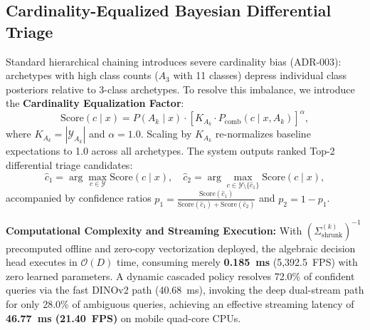 \subsection{Cardinality-Equalized Bayesian Differential Triage}
\label{subsec:bayesian_differential_triage}
Standard hierarchical chaining introduces severe cardinality bias (ADR-003): archetypes with high class counts ($A_3$ with 11 classes) depress individual class posteriors relative to 3-class archetypes. To resolve this imbalance, we introduce the \textbf{Cardinality Equalization Factor}:
\begin{equation}
    \text{Score}(c \mid x) = P(A_k \mid x) \cdot \left[ K_{A_k} \cdot P_{\text{comb}}(c \mid x, A_k) \right]^\alpha,
    \label{eq:cardinality_score}
\end{equation}
where $K_{A_k} = |\mathcal{Y}_{A_k}|$ and $\alpha = 1.0$. Scaling by $K_{A_k}$ re-normalizes baseline expectations to 1.0 across all archetypes. The system outputs ranked Top-2 differential triage candidates:
\begin{equation}
    \hat{c}_1 = \arg\max_{c \in \mathcal{Y}} \text{Score}(c \mid x), \quad \hat{c}_2 = \arg\max_{c \in \mathcal{Y} \setminus \{\hat{c}_1\}} \text{Score}(c \mid x),
    \label{eq:top1_top2_decision}
\end{equation}
accompanied by confidence ratios $p_1 = \frac{\text{Score}(\hat{c}_1)}{\text{Score}(\hat{c}_1) + \text{Score}(\hat{c}_2)}$ and $p_2 = 1 - p_1$.

\noindent\textbf{Computational Complexity and Streaming Execution:}
With $\left(\Sigma_{\text{shrunk}}^{(k)}\right)^{-1}$ precomputed offline and zero-copy vectorization deployed, the algebraic decision head executes in $\mathcal{O}(D)$ time, consuming merely \textbf{0.185~ms} (5,392.5~FPS) with zero learned parameters. A dynamic cascaded policy resolves 72.0\% of confident queries via the fast DINOv2 path (40.68~ms), invoking the deep dual-stream path for only 28.0\% of ambiguous queries, achieving an effective streaming latency of \textbf{46.77~ms (21.40~FPS)} on mobile quad-core CPUs.